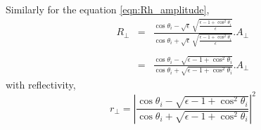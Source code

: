 Similarly for the equation \ref{eqn:Rh_amplitude},
\begin{eqnarray}
  R_{\perp} &=& \frac{\cos\theta_{i} - \sqrt{\epsilon}\,\sqrt{\displaystyle\frac{\epsilon - 1 + \cos^{2}\theta_{i}}{\epsilon}}}{\cos\theta_{i} + \sqrt{\epsilon}\,\sqrt{\displaystyle\frac{\epsilon - 1 + \cos^{2}\theta_{i}}{\epsilon}}}.A_{\perp}\nonumber\\\nonumber\\
                &=& \frac{\cos\theta_{i} - \sqrt{\epsilon - 1 + \cos^{2}\theta_{i}}}{\cos\theta_{i} + \sqrt{\epsilon - 1 + \cos^{2}\theta_{i}}}.A_{\perp}
  \label{eqn:Rh_amplitude2}
\end{eqnarray}
with reflectivity,
\begin{equation}
  r_{\perp} = \left|\frac{\cos\theta_{i} - \sqrt{\epsilon - 1 + \cos^{2}\theta_{i}}}{\cos\theta_{i} + \sqrt{\epsilon - 1 + \cos^{2}\theta_{i}}}\right|^{2}
  \label{eqn:Rh_reflectivity}
\end{equation}


